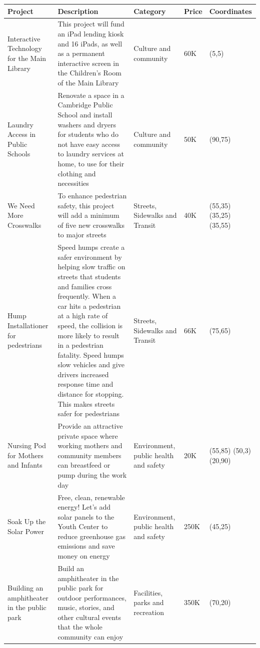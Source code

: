 \documentclass{comsoc2023}
\begin{document}
\begin{longtable}[ht!]{|p{2cm}|p{6cm}|p{3cm}|p{1cm}|p{2.5cm}|}
    \hline
    \textbf{Project} & \textbf{Description} & \textbf{Category} & \textbf{Price} & \textbf{Coordinates}\\
    \hline
    Interactive Technology for the Main Library & This project will fund an iPad lending kiosk and 16 iPads, as well as a permanent interactive screen in the Children’s Room of the Main Library & Culture and community & 60K & (5,5)\\
    \hline
    Laundry Access in Public Schools & Renovate a space in a Cambridge Public School and install washers and dryers for students who do not have easy access to laundry services at home, to use for their clothing and necessities & Culture and community & 50K & (90,75)\\
    \hline
    We Need More Crosswalks & To enhance pedestrian safety, this project will add a minimum of five new crosswalks to major streets & Streets, Sidewalks and Transit &  40K & (55,35) (35,25) (35,55)\\
    \hline
    Hump Installationer for pedestrians & Speed humps create a safer environment by helping slow traffic on streets that students and families cross frequently. When a car hits a pedestrian at a high rate of speed, the collision is more likely to result in a pedestrian fatality. Speed humps slow vehicles and give drivers increased response time and distance for stopping. This makes streets safer for pedestrians & Streets, Sidewalks and Transit & 66K & (75,65)\\
    \hline
    Nursing Pod for Mothers and Infants & Provide an attractive private space where working mothers and community members can breastfeed or pump during the work day & Environment, public health and safety & 20K & (55,85) (50,3) (20,90)\\
    \hline
    Soak Up the Solar Power & Free, clean, renewable energy! Let’s add solar panels to the Youth Center to reduce greenhouse gas emissions and save money on energy & Environment, public health and safety & 250K & (45,25)\\
    \hline
    Building an amphitheater in the public park & Build an amphitheater in the public park for outdoor performances, music, stories, and other cultural events that the whole community can enjoy & Facilities, parks and recreation & 350K & (70,20)\\

\end{longtable}
\end{document}
